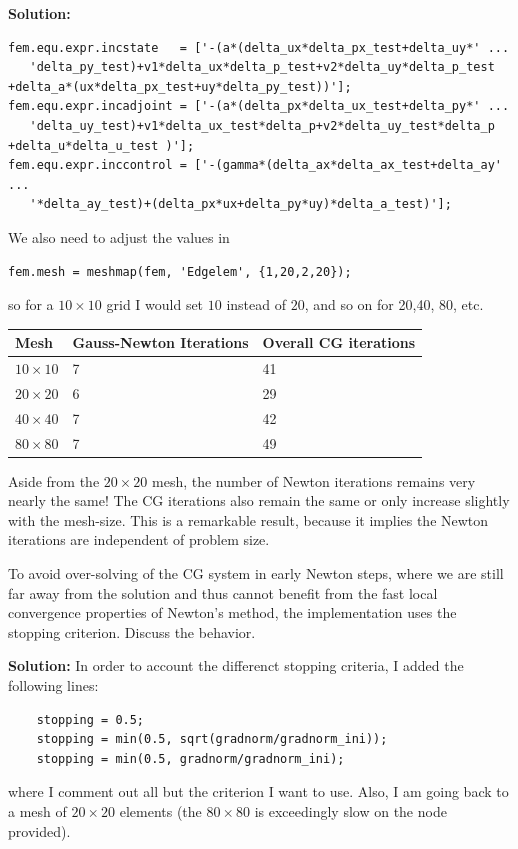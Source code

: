\documentclass[11pt]{article}
\newenvironment{solution}{\begin{trivlist}\item[]{\bf Solution:}}
                      {\end{trivlist}}
\begin{document}
\begin{enumerate}
\begin{solution}
\begin{lstlisting}
fem.equ.expr.incstate   = ['-(a*(delta_ux*delta_px_test+delta_uy*' ...
   'delta_py_test)+v1*delta_ux*delta_p_test+v2*delta_uy*delta_p_test
+delta_a*(ux*delta_px_test+uy*delta_py_test))'];
fem.equ.expr.incadjoint = ['-(a*(delta_px*delta_ux_test+delta_py*' ...
   'delta_uy_test)+v1*delta_ux_test*delta_p+v2*delta_uy_test*delta_p
+delta_u*delta_u_test )'];
fem.equ.expr.inccontrol = ['-(gamma*(delta_ax*delta_ax_test+delta_ay' ...
   '*delta_ay_test)+(delta_px*ux+delta_py*uy)*delta_a_test)'];
\end{lstlisting}
We also need to adjust the values in
\begin{lstlisting}
fem.mesh = meshmap(fem, 'Edgelem', {1,20,2,20});
\end{lstlisting}
so for a $10\times 10$ grid I would set $10$ instead of $20$, and so on 
 for 20,40, 80, etc. 
 
\begin{center}
\begin{tabular}{l||l|l}
 Mesh & Gauss-Newton Iterations & Overall CG iterations\\
\hline\hline
$10\times 10$ & 7 & 41\\
$20\times 20$ & 6 & 29\\
$40\times 40$ & 7 & 42\\
$80\times 80$ & 7 & 49
\end{tabular}
\end{center}

Aside from the $20\times20$ mesh, the number of Newton iterations
 remains very nearly the same! The CG iterations also remain the same or only
 increase slightly with the mesh-size. This is a remarkable result,
 because it implies the Newton iterations are independent of problem
 size. 

\end{solution}

\item[(c)]To avoid over-solving of the CG system in early Newton steps,
	  where we are still far away from the solution and thus cannot
	  benefit from the fast local convergence properties of Newton's
	  method, the implementation uses the stopping
	  criterion. Discuss the behavior.  


\begin{solution}
In order to account the differenct stopping criteria, I added the following lines:
\begin{lstlisting}
    stopping = 0.5;
    stopping = min(0.5, sqrt(gradnorm/gradnorm_ini));
    stopping = min(0.5, gradnorm/gradnorm_ini);
\end{lstlisting}
where I comment out all but the criterion I want to use. Also, I am
 going back to a mesh of $20\times 20$ elements (the $80\times 80$ is
 exceedingly slow on the node provided). 


\end{solution}
\end{enumerate}
\end{document}
